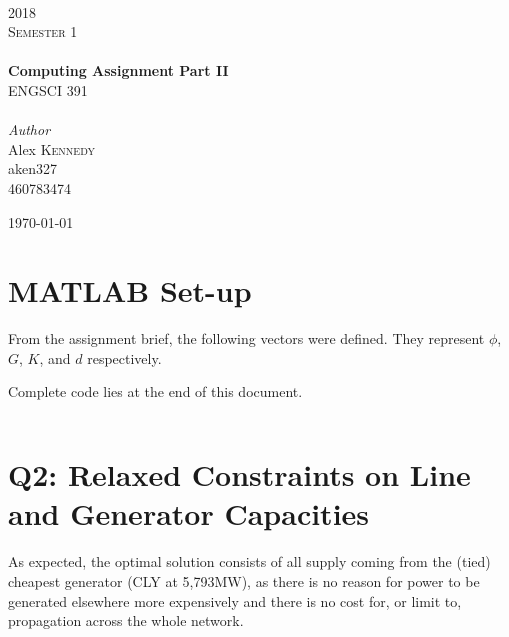 \documentclass[11pt]{article}
\begin{document}
\begin{titlepage}
	\newcommand{\HRule}{\rule{\linewidth}{0.5mm}} %

	\center


	\textsc{\LARGE }\\[1.5cm]
	\textsc{\Large 2018}\\[0.5cm]
	\textsc{\large Semester 1}\\[1cm]

	{
	}\\[0.4cm]

	{\huge\bfseries Computing Assignment Part II}\\[0.6cm]
	{\large ENGSCI 391}\\[1cm]

	{
	}\\[1cm]

	{\large\textit{Author}}\\
	Alex \textsc{Kennedy\\[1cm]}
	aken327\\
	460783474

	\vfill\vfill\vfill
	{\large\today}
	\vfill

\end{titlepage}

\section*{MATLAB Set-up}

From the assignment brief, the following vectors were defined. They represent $\phi$, $G$, $K$, and $d$ respectively. 

Complete code lies at the end of this document.

\inputminted[firstline=1, lastline=4]{matlab}{main.m}

\section*{Q2: Relaxed Constraints on Line and Generator Capacities}
As expected, the optimal solution consists of all supply coming from the (tied) cheapest generator (CLY at 5,793MW), as there is no reason for power to be generated elsewhere more expensively and there is no cost for, or limit to, propagation across the whole network. 
\end{document}
